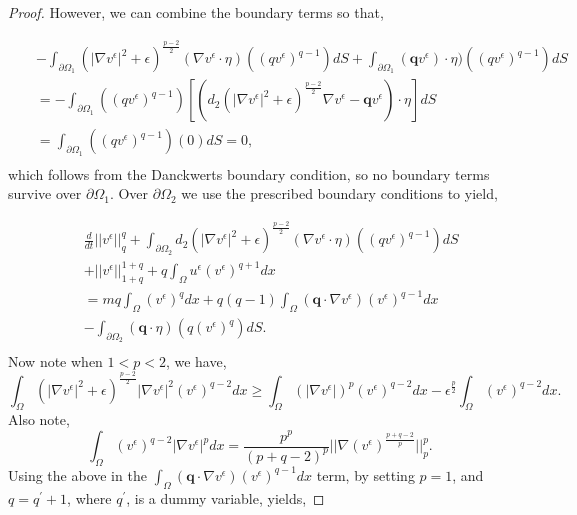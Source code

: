 \documentclass[10pt]{amsart}
\theoremstyle{plain}
\theoremstyle{definition}
\begin{document}
\begin{proof}
However, we can combine the boundary terms so that,

\begin{eqnarray}
 &&   -\int_{\partial \Omega_{1}} \left(
|\nabla v^{\epsilon}|^{2}+{\epsilon}\right)^{\frac{p-2}{2}}( \nabla v^{\epsilon} \cdot \eta ) ((qv^{\epsilon})^{q-1}) dS
+ \int_{\partial \Omega_{1}} (\textbf{q} v^{\epsilon}) \cdot \eta) ((qv^{\epsilon})^{q-1}) dS \nonumber \\
&& = - \int_{\partial \Omega_{1}} ((qv^{\epsilon})^{q-1})  [(d_2  \left(|\nabla v^{\epsilon}|^{2}+{\epsilon}\right)^{\frac{p-2}{2}}  \nabla v^{\epsilon} - \textbf{q} v^{\epsilon})  \cdot \eta] dS \nonumber \\
&& = \int_{\partial \Omega_{1}} ((qv^{\epsilon})^{q-1}) (0)dS = 0, \nonumber \\
\end{eqnarray}
%
which follows from the Danckwerts boundary condition, so no boundary terms survive over $\partial \Omega_{1}$. Over $\partial \Omega_{2}$ we use the prescribed boundary conditions to yield,


\begin{eqnarray}
&& \frac{d}{dt}||v^{\epsilon}||^{q}_{q} + 
\int_{\partial \Omega_{2}} d_{2}\left(
|\nabla v^{\epsilon}|^{2}+{\epsilon}\right)^{\frac{p-2}{2}}( \nabla v^{\epsilon} \cdot \eta ) ((qv^{\epsilon})^{q-1}) dS \nonumber \\
&&+||v^{\epsilon}||^{1+q}_{1+q} 
 + q\int_{\Omega}  u^{\epsilon}(v^{\epsilon})^{q+1}dx \nonumber \\
 && =mq\int_{\Omega} (v^{\epsilon})^{q}dx + q(q-1)\int_{\Omega} (\textbf{q}\cdot \nabla v^{\epsilon}) (v^{\epsilon})^{q-1}dx \nonumber \\
 &&  
 - \int_{\partial \Omega_{2}} (\textbf{q}  \cdot \eta) (q(v^{\epsilon})^{q}) dS .
 \nonumber \\
\end{eqnarray}
%
%
Now note when $1<p<2$, we have,
\begin{equation}
\label{eq:in1}
\int_{\Omega} \left(
|\nabla v^{\epsilon}|^{2}+{\epsilon}\right)^{\frac{p-2}{2}}|\nabla v^{\epsilon}|^{2} (v^{\epsilon})^{q-2} dx
\geq 
\int_{\Omega} \left(
|\nabla v^{\epsilon}|\right)^{p}(v^{\epsilon})^{q-2} dx - \epsilon^{\frac{p}{2}}\int_{\Omega} (v^{\epsilon})^{q-2} dx .
\end{equation}
%
Also note,
\begin{equation}
\label{eq:in2}
\int_{\Omega} (v^{\epsilon})^{q-2}|\nabla v^{\epsilon}|^{p}dx = \frac{p^{p}}{(p+q-2)^{p}}||\nabla (v^{\epsilon})^{\frac{p+q-2}{p}}||^{p}_{p}.
\end{equation}
%
Using the above in the $\int_{\Omega} (\textbf{q}\cdot \nabla v^{\epsilon}) (v^{\epsilon})^{q-1}dx$ term, by setting $p=1$, and $q=q^{'}+1$, where $q^{'}$, is a dummy variable, yields, 


\end{proof}
\end{document}
